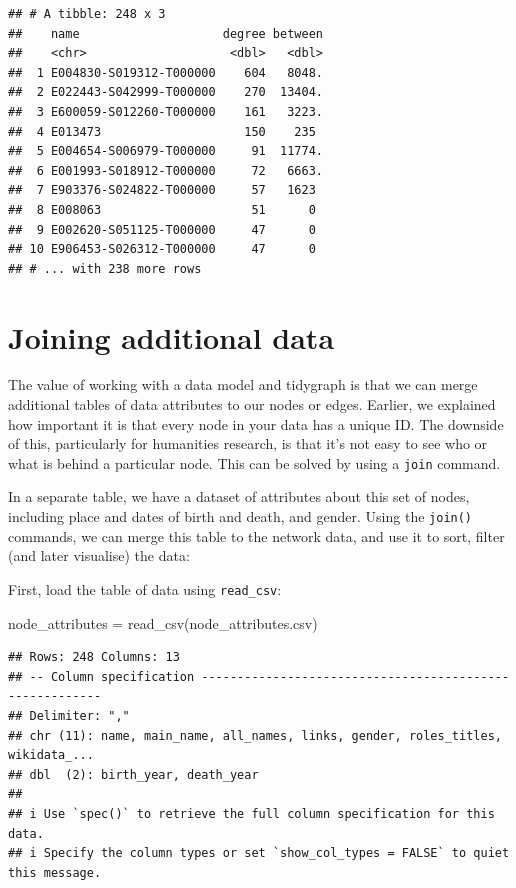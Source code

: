\documentclass[
]{book}
\newenvironment{Shaded}{\begin{snugshade}}{\end{snugshade}}
\newcommand{\FunctionTok}[1]{\textcolor[rgb]{0.00,0.00,0.00}{#1}}
\newcommand{\NormalTok}[1]{#1}
\newcommand{\OtherTok}[1]{\textcolor[rgb]{0.56,0.35,0.01}{#1}}
\newcommand{\StringTok}[1]{\textcolor[rgb]{0.31,0.60,0.02}{#1}}
\begin{document}
\begin{verbatim}
## # A tibble: 248 x 3
##    name                    degree between
##    <chr>                    <dbl>   <dbl>
##  1 E004830-S019312-T000000    604   8048.
##  2 E022443-S042999-T000000    270  13404.
##  3 E600059-S012260-T000000    161   3223.
##  4 E013473                    150    235 
##  5 E004654-S006979-T000000     91  11774.
##  6 E001993-S018912-T000000     72   6663.
##  7 E903376-S024822-T000000     57   1623 
##  8 E008063                     51      0 
##  9 E002620-S051125-T000000     47      0 
## 10 E906453-S026312-T000000     47      0 
## # ... with 238 more rows
\end{verbatim}

\hypertarget{joining-additional-data}{%
\section{Joining additional data}\label{joining-additional-data}}

The value of working with a data model and tidygraph is that we can merge additional tables of data attributes to our nodes or edges. Earlier, we explained how important it is that every node in your data has a unique ID. The downside of this, particularly for humanities research, is that it's not easy to see who or what is behind a particular node. This can be solved by using a \texttt{join} command.

In a separate table, we have a dataset of attributes about this set of nodes, including place and dates of birth and death, and gender. Using the \texttt{join()} commands, we can merge this table to the network data, and use it to sort, filter (and later visualise) the data:

First, load the table of data using \texttt{read\_csv}:

\begin{Shaded}
\begin{Highlighting}[]
\NormalTok{node\_attributes }\OtherTok{=} \FunctionTok{read\_csv}\NormalTok{(}\StringTok{\textquotesingle{}node\_attributes.csv\textquotesingle{}}\NormalTok{)}
\end{Highlighting}
\end{Shaded}

\begin{verbatim}
## Rows: 248 Columns: 13
## -- Column specification --------------------------------------------------------
## Delimiter: ","
## chr (11): name, main_name, all_names, links, gender, roles_titles, wikidata_...
## dbl  (2): birth_year, death_year
## 
## i Use `spec()` to retrieve the full column specification for this data.
## i Specify the column types or set `show_col_types = FALSE` to quiet this message.
\end{verbatim}
\end{document}
